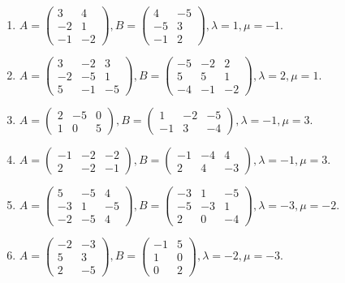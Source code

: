 \begin{enumerate}[label=\arabic*.,]
\item $A = \begin{pmatrix} 3 & 4 \\ -2 & 1 \\ -1 & -2 \end{pmatrix},  B = \begin{pmatrix} 4 & -5 \\ -5 & 3 \\ -1 & 2 \end{pmatrix},  \lambda = 1,  \mu = -1$.
\item $A = \begin{pmatrix} 3 & -2 & 3 \\ -2 & -5 & 1 \\ 5 & -1 & -5 \end{pmatrix},  B = \begin{pmatrix} -5 & -2 & 2 \\ 5 & 5 & 1 \\ -4 & -1 & -2 \end{pmatrix},  \lambda = 2,  \mu = 1$.
\item $A = \begin{pmatrix} 2 & -5 & 0 \\ 1 & 0 & 5 \end{pmatrix},  B = \begin{pmatrix} 1 & -2 & -5 \\ -1 & 3 & -4 \end{pmatrix},  \lambda = -1,  \mu = 3$.
\item $A = \begin{pmatrix} -1 & -2 & -2 \\ 2 & -2 & -1 \end{pmatrix},  B = \begin{pmatrix} -1 & -4 & 4 \\ 2 & 4 & -3 \end{pmatrix},  \lambda = -1,  \mu = 3$.
\item $A = \begin{pmatrix} 5 & -5 & 4 \\ -3 & 1 & -5 \\ -2 & -5 & 4 \end{pmatrix},  B = \begin{pmatrix} -3 & 1 & -5 \\ -5 & -3 & 1 \\ 2 & 0 & -4 \end{pmatrix},  \lambda = -3,  \mu = -2$.
\item $A = \begin{pmatrix} -2 & -3 \\ 5 & 3 \\ 2 & -5 \end{pmatrix},  B = \begin{pmatrix} -1 & 5 \\ 1 & 0 \\ 0 & 2 \end{pmatrix},  \lambda = -2,  \mu = -3$.

\end{enumerate}
